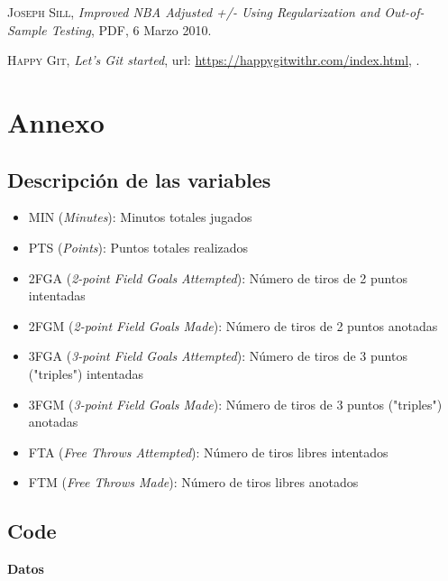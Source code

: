 \documentclass[paper=a4, fontsize=9pt]{article}
\begin{document}

\begin{thebibliography}{X}
	 \textsc{Joseph Sill}, \textit{Improved NBA Adjusted +/- Using Regularization and Out-of-Sample Testing}, PDF, 6 Marzo 2010.
	
	 \textsc{Happy Git}, \textit{Let’s Git started}, url: \url{https://happygitwithr.com/index.html}, .
\end{thebibliography}

\clearpage

\section{Annexo}

\subsection{Descripción de las variables} \label{sec:Annexo1}

\begin{itemize}
\item MIN (\emph{Minutes}): Minutos totales jugados
\item PTS (\emph{Points}): Puntos totales realizados
\item 2FGA (\emph{2-point Field Goals Attempted}): Número de tiros de 2 puntos intentadas
\item 2FGM (\emph{2-point Field Goals Made}): Número de tiros de 2 puntos anotadas
\item 3FGA (\emph{3-point Field Goals Attempted}): Número de tiros de 3 puntos ("triples") intentadas
\item 3FGM (\emph{3-point Field Goals Made}): Número de tiros de 3 puntos ("triples") anotadas
\item FTA (\emph{Free Throws Attempted}): Número de tiros libres intentados
\item FTM (\emph{Free Throws Made}): Número de tiros libres anotados
\end{itemize}

\clearpage

\subsection{Code}

\textbf{Datos}
\end{document}
